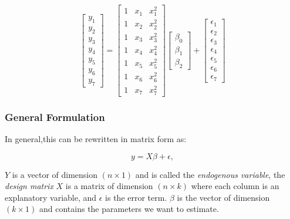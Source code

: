 \begin{equation}\label{eq:simpleRegression}
  \begin{bmatrix}y_1 \\ y_2 \\ y_3 \\ y_4 \\ y_5 \\ y_6 \\ y_7 \end{bmatrix}
  =
  \begin{bmatrix}1 & x_1 & x_1^2 \\1 & x_2  & x_2^2 \\1 & x_3  & x_3^2 \\1 & x_4  & x_4^2 \\1 & x_5  & x_5^2 \\1 & x_6  & x_6^2 \\ 1 & x_7  & x_7^2 \end{bmatrix}
  \begin{bmatrix} \beta_0 \\ \beta_1  \\ \beta_2 \end{bmatrix}
  +
  \begin{bmatrix} \epsilon_1 \\ \epsilon_2 \\ \epsilon_3 \\ \epsilon_4 \\ \epsilon_5 \\ \epsilon_6 \\ \epsilon_7 \end{bmatrix}
\end{equation}

\subsubsection{General Formulation}

In general,this can be rewritten in matrix form as:

\begin{equation}\label{eq:DesignMatrix}
    y=X\beta+ \epsilon,
\end{equation}

$Y$ is a vector of dimension $(n \times 1)$ and is called the \emph{endogenous variable}, the \emph{design matrix}  $X$ is a matrix of dimension $(n \times k)$ where each column is an explanatory variable, and $\epsilon$ is the error term. $\beta$ is the vector of dimension $(k \times 1)$ and contains the parameters we want to estimate.

